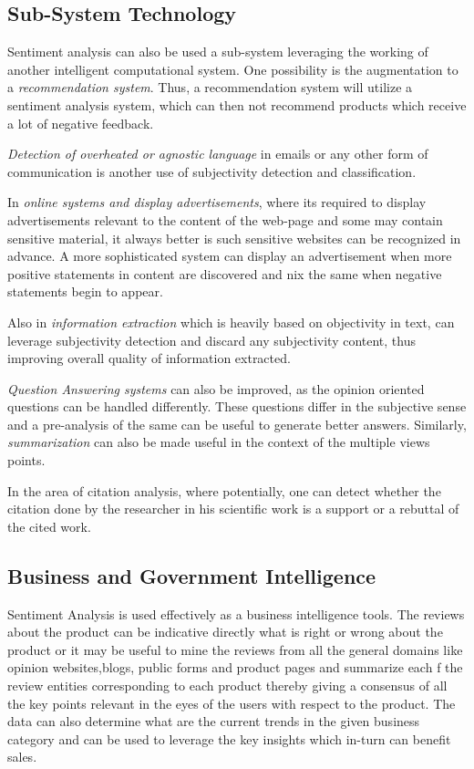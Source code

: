 \subsection{Sub-System Technology}
Sentiment analysis can also be used a sub-system leveraging the working of another intelligent computational system. One possibility is the augmentation to a \textit{recommendation system}. Thus, a recommendation system will utilize a sentiment analysis system, which can then not recommend products which receive a lot of negative feedback.  

\textit{Detection of overheated or agnostic  language} in emails or any other form of communication is another use of subjectivity detection and classification. 

In \textit{online systems and display advertisements}, where its required to display advertisements relevant to the content of the web-page and some may contain sensitive material, it always better is such sensitive websites can be  recognized in advance. A more sophisticated system can display an advertisement when more positive statements in content are discovered and nix the same when negative statements begin to appear. 

Also in \textit{information extraction} which is heavily based on objectivity in text, can leverage subjectivity detection and discard any subjectivity content, thus improving overall quality of information extracted.  

\textit{Question Answering systems} can also be improved, as the opinion oriented questions can be handled differently. These questions differ in the subjective sense and a pre-analysis of the same can be useful to generate better answers. Similarly, \textit{summarization} can also be made useful in the context of the multiple views points.  

In the area of citation analysis, where potentially, one can detect whether the citation done by the researcher in his scientific work is a support or a rebuttal of the cited work.

\subsection{Business and Government Intelligence}
Sentiment Analysis is used effectively as a business intelligence tools. The reviews about the product can be indicative directly what is right or wrong about the product or it may be useful to mine the reviews from all the general domains like opinion websites,blogs, public forms and product pages and summarize each f the review entities corresponding to each product thereby giving a consensus of all the key points relevant in the eyes of the users with respect to the product. The data can also determine what are the current trends in the given business category and can be used to leverage the key insights which in-turn can benefit sales.  

